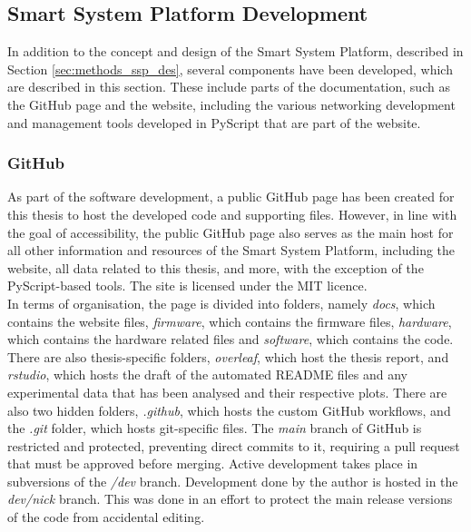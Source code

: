 \subsection{\label{sec:methods_ssp_dev}Smart System Platform Development}

In addition to the concept and design of the Smart System Platform, described in Section \ref{sec:methods_ssp_des}, several components have been developed, which are described in this section. These include parts of the documentation, such as the GitHub page and the website, including the various networking development and management tools developed in PyScript that are part of the website.

\subsubsection{\label{sec:methods_gh}GitHub}
As part of the software development, a public GitHub page has been created for this thesis to host the developed code and supporting files. However, in line with the goal of accessibility, the public GitHub page also serves as the main host for all other information and resources of the Smart System Platform, including the website, all data related to this thesis, and more, with the exception of the PyScript-based tools. The site is licensed under the MIT licence. \\

In terms of organisation, the page is divided into folders, namely \textit{docs}, which contains the website files, \textit{firmware}, which contains the firmware files, \textit{hardware}, which contains the hardware related files and \textit{software}, which contains the code. There are also thesis-specific folders, \textit{overleaf}, which host the thesis report, and \textit{rstudio}, which hosts the draft of the automated README files and any experimental data that has been analysed and their respective plots. There are also two hidden folders, \textit{.github}, which hosts the custom GitHub workflows, and the \textit{.git} folder, which hosts git-specific files. The \textit{main} branch of GitHub is restricted and protected, preventing direct commits to it, requiring a pull request that must be approved before merging. Active development takes place in subversions of the \textit{/dev} branch. Development done by the author is hosted in the \textit{dev/nick} branch. This was done in an effort to protect the main release versions of the code from accidental editing. \\

